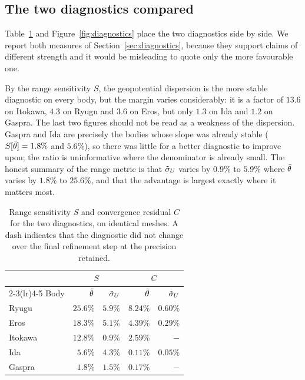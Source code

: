 \subsection{The two diagnostics compared}
\label{sec:varcompare}

Table~\ref{tab:varsens} and Figure~\ref{fig:diagnostics} place the two
diagnostics side by side. We report both
measures of Section~\ref{sec:diagnostics}, because they support claims of
different strength and it would be misleading to quote only the more favourable
one.

By the range sensitivity $S$, the geopotential dispersion is the more stable
diagnostic on every body, but the margin varies considerably: it is a factor of
$13.6$ on Itokawa, $4.3$ on Ryugu and $3.6$ on Eros, but only $1.3$ on Ida and
$1.2$ on Gaspra. The last two figures should not be read as a weakness of the
dispersion. Gaspra and Ida are precisely the bodies whose slope was already
stable ($S[\bar{\theta}]=1.8\%$ and $5.6\%$), so there was little for a better
diagnostic to improve upon; the ratio is uninformative where the denominator is
already small. The honest summary of the range metric is that $\tilde{\sigma}_{U}$ varies
by $0.9\%$ to $5.9\%$ where $\bar{\theta}$ varies by $1.8\%$ to $25.6\%$, and that
the advantage is largest exactly where it matters most.

\begin{table}[t]
\centering
\small
\caption{Range sensitivity $S$ and convergence residual $C$ for the two
diagnostics, on identical meshes. A dash indicates that the diagnostic did not
change over the final refinement step at the precision retained.}
\label{tab:varsens}
\begin{tabular}{lrrrr}
\toprule
& \multicolumn{2}{c}{$S$} & \multicolumn{2}{c}{$C$} \\
\cmidrule(lr){2-3}\cmidrule(lr){4-5}
Body & $\bar{\theta}$ & $\tilde{\sigma}_{U}$ & $\bar{\theta}$ & $\tilde{\sigma}_{U}$ \\
\midrule
Ryugu   & $25.6\%$ & $5.9\%$ & $8.24\%$ & $0.60\%$ \\
Eros    & $18.3\%$ & $5.1\%$ & $4.39\%$ & $0.29\%$ \\
Itokawa & $12.8\%$ & $0.9\%$ & $2.59\%$ & $-$      \\
Ida     & $5.6\%$  & $4.3\%$ & $0.11\%$ & $0.05\%$ \\
Gaspra  & $1.8\%$  & $1.5\%$ & $0.17\%$ & $-$      \\
\bottomrule
\end{tabular}
\end{table}

